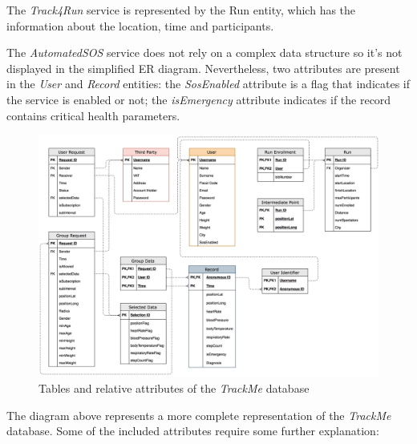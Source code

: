 The \textit{Track4Run} service is represented by the Run entity, which has the information about the location, time and participants.

The \textit{AutomatedSOS} service does not rely on a complex data structure so it’s not displayed in the simplified ER diagram. Nevertheless, two attributes are present in the \textit{User} and \textit{Record} entities: the \textit{SosEnabled} attribute is a flag that indicates if the service is enabled or not; the \textit{isEmergency} attribute indicates if the record contains critical health parameters.

\begin{figure}[H]

\includegraphics[scale=0.17,keepaspectratio]{./Pictures/ER-tables.png}
\centering
\caption{Tables and relative attributes of the \textit{TrackMe} database}

\end{figure}

The diagram above represents a more complete representation of the \textit{TrackMe} database. Some of the included attributes require some further explanation:

